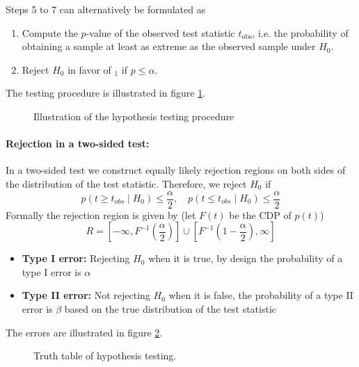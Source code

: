 Steps 5 to 7 can alternatively be formulated as
\begin{enumerate}
    \item Compute the $p$-value of the observed test statistic $t_{\text{obs}}$, i.e. the probability of obtaining a sample
    at least as extreme as the observed sample under $H_0$.
    \item Reject $H_0$ in favor of $_1$ if $p \leq \alpha$.
\end{enumerate}

The testing procedure is illustrated in figure \ref{fig:hypothesis_testing}.

\begin{figure}
    \centering
    
    \caption{Illustration of the hypothesis testing procedure}
    \label{fig:hypothesis_testing}
\end{figure}

\paragraph*{Rejection in a two-sided test:} In a two-sided test we construct equally likely
rejection regions on both sides of the distribution of the test statistic. Therefore, we reject
$H_0$ if
\begin{equation}
    p\left(t \geq t_{o b s} \mid H_0\right) \leq \frac{\alpha}{2}, \quad p\left(t \leq t_{o b s} \mid H_0\right) \leq \frac{\alpha}{2}
\end{equation}
Formally the rejection region is given by (let $F(t)$ be the CDP of $p(t)$)
\begin{equation}
    R=\left[-\infty, F^{-1}\left(\frac{\alpha}{2}\right)\right] \cup\left[F^{-1}\left(1-\frac{\alpha}{2}\right), \infty\right]
\end{equation}

\begin{itemize}
    \item \textbf{Type I error:} Rejecting $H_0$ when it is true, by design the probability of a type I error is $\alpha$
    \item \textbf{Type II error:} Not rejecting $H_0$ when it is false, the probability of a type II error is $\beta$ based on the true distribution of the test statistic
\end{itemize}
The errors are illustrated in figure \ref{fig:type_1_2_error}.

\begin{figure}
    \centering
    
    \caption{Truth table of hypothesis testing.}
    \label{fig:type_1_2_error}
\end{figure}

